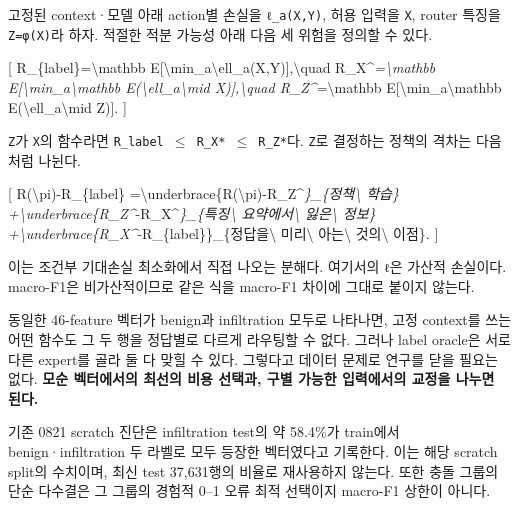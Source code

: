 고정된 context·모델 아래 action별 손실을 \texttt{ℓ\_\allowbreak{}\allowbreak{}a(X,\allowbreak{}Y)\allowbreak{}}, 허용 입력을 \texttt{X}, router 특징을 \texttt{Z=\allowbreak{}\allowbreak{}φ(X)}라 하자. 적절한 적분 가능성 아래 다음 세 위험을 정의할 수 있다.

[ R\_\allowbreak{}\{label\}=\allowbreak{}\textbackslash{}mathbb E[\textbackslash{}min\_\allowbreak{}a\textbackslash{}ell\_\allowbreak{}a(X,Y)],\textbackslash{}quad R\_\allowbreak{}X\textasciicircum{}\emph{=\allowbreak{}\textbackslash{}mathbb E[\textbackslash{}min\_\allowbreak{}a\textbackslash{}mathbb E(\textbackslash{}ell\_\allowbreak{}a\textbackslash{}mid X)],\textbackslash{}quad R\_\allowbreak{}Z\textasciicircum{}}=\allowbreak{}\textbackslash{}mathbb E[\textbackslash{}min\_\allowbreak{}a\textbackslash{}mathbb E(\textbackslash{}ell\_\allowbreak{}a\textbackslash{}mid Z)]. ]

\texttt{Z}가 \texttt{X}의 함수라면 \texttt{R\_\allowbreak{}\allowbreak{}label \allowbreak{}\ensuremath{\leq} R\_\allowbreak{}\allowbreak{}X* \ensuremath{\leq}\allowbreak{} R\_\allowbreak{}\allowbreak{}Z*}다. \texttt{Z}로 결정하는 정책의 격차는 다음처럼 나뉜다.

[ R(\textbackslash{}pi)-R\_\allowbreak{}\{label\} =\allowbreak{}\textbackslash{}underbrace\{R(\textbackslash{}pi)-R\_\allowbreak{}Z\textasciicircum{}\emph{\}\_\allowbreak{}\{정책\textbackslash{} 학습\} +\allowbreak{}\textbackslash{}underbrace\{R\_\allowbreak{}Z\textasciicircum{}}-R\_\allowbreak{}X\textasciicircum{}\emph{\}\_\allowbreak{}\{특징\textbackslash{} 요약에서\textbackslash{} 잃은\textbackslash{} 정보\} +\allowbreak{}\textbackslash{}underbrace\{R\_\allowbreak{}X\textasciicircum{}}-R\_\allowbreak{}\{label\}\}\_\allowbreak{}\{정답을\textbackslash{} 미리\textbackslash{} 아는\textbackslash{} 것의\textbackslash{} 이점\}. ]

이는 조건부 기대손실 최소화에서 직접 나오는 분해다. 여기서의 \texttt{ℓ}은 가산적 손실이다. macro-F1은 비가산적이므로 같은 식을 macro-F1 차이에 그대로 붙이지 않는다.

동일한 46-feature 벡터가 benign과 infiltration 모두로 나타나면, 고정 context를 쓰는 어떤 함수도 그 두 행을 정답별로 다르게 라우팅할 수 없다. 그러나 label oracle은 서로 다른 expert를 골라 둘 다 맞힐 수 있다. 그렇다고 데이터 문제로 연구를 닫을 필요는 없다. \textbf{모순 벡터에서의 최선의 비용 선택과, 구별 가능한 입력에서의 교정을 나누면 된다.}

기존 0821 scratch 진단은 infiltration test의 약 58.4\%가 train에서 benign·infiltration 두 라벨로 모두 등장한 벡터였다고 기록한다. 이는 해당 scratch split의 수치이며, 최신 test 37,631행의 비율로 재사용하지 않는다. 또한 충돌 그룹의 단순 다수결은 그 그룹의 경험적 0–1 오류 최적 선택이지 macro-F1 상한이 아니다.


